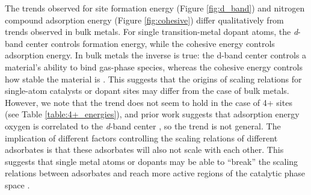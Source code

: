 The trends observed for site formation energy (Figure \ref{fig:d_band}) and nitrogen compound adsorption energy (Figure \ref{fig:cohesive}) differ qualitatively from trends observed in bulk metals. For single transition-metal dopant atoms, the \textit{d}-band center controls formation energy, while the cohesive energy controls adsorption energy. In bulk metals the inverse is true: the d-band center controls a material's ability to bind gas-phase species, whereas the cohesive energy controls how stable the material is \cite{Hammer_1995}. This suggests that the origins of scaling relations for single-atom catalysts or dopant sites may differ from the case of bulk metals. However, we note that the trend does not seem to hold in the case of 4+ sites (see Table \ref{table:4+_energies}), and prior work suggests that adsorption energy oxygen is correlated to the \textit{d}-band center \cite{Hammer_2000}, so the trend is not general. The implication of different factors controlling the scaling relations of different adsorbates is that these adsorbates will also not scale with each other. This suggests that single metal atoms or dopants may be able to ``break'' the scaling relations between adsorbates and reach more active regions of the catalytic phase space \cite{Gani_2018, Darby_2018}.







